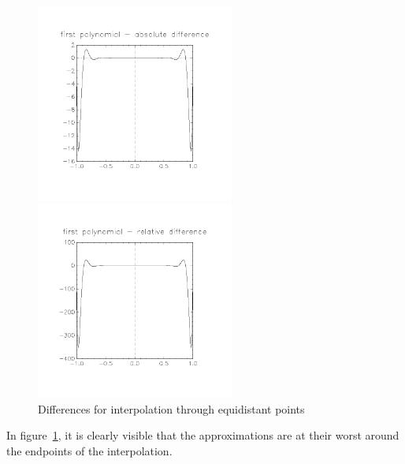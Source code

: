 \documentclass[11pt, a4paper, titlepage, openright]{article}
\begin{document}
    \begin{figure}[H]
        \begin{minipage}[b]{0.49\textwidth}
            \includegraphics[width=6.5cm, trim={2cm, 4cm, 2cm, 3cm}, clip]{../images/diff1abs}
        \end{minipage}
        \hfill
        \begin{minipage}[b]{0.49\textwidth}
            \includegraphics[width=6.5cm, trim={2cm, 4cm, 2cm, 3cm}, clip]{../images/diff1rel}
        \end{minipage}
        \caption{Differences for interpolation through equidistant points}
        \label{fig:diff1}
    \end{figure}
    In figure~\ref{fig:diff1}, it is clearly visible that the approximations are at their worst around the endpoints of the interpolation.
\end{document}
